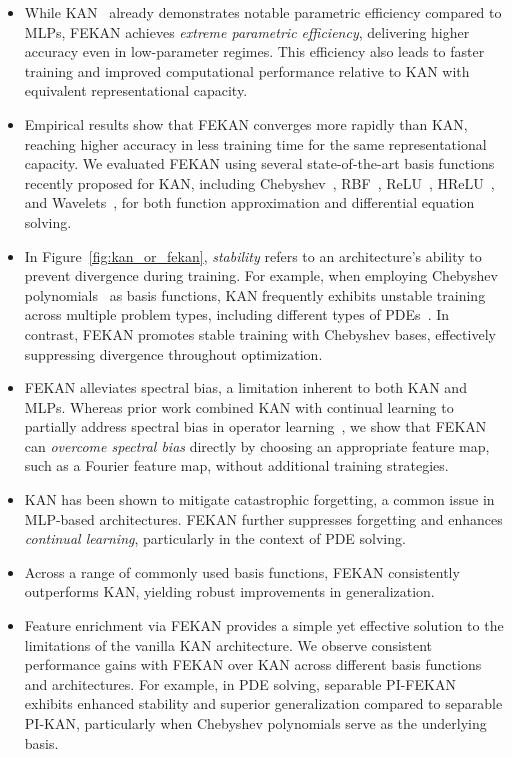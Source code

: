 \documentclass{article}
\begin{document}
\begin{itemize}
    \item While KAN~\cite{liu2024kan} already demonstrates notable parametric efficiency compared to MLPs, FEKAN achieves \textit{extreme parametric efficiency}, delivering higher accuracy even in low-parameter regimes. This efficiency also leads to faster training and improved computational performance relative to KAN with equivalent representational capacity.

    \item Empirical results show that FEKAN converges more rapidly than KAN, reaching higher accuracy in less training time for the same representational capacity. We evaluated FEKAN using several state-of-the-art basis functions recently proposed for KAN, including Chebyshev~\cite{ss2024chebyshev}, RBF~\cite{li2024kolmogorov}, ReLU~\cite{qiu2024relu}, HReLU~\cite{so2025higher}, and Wavelets~\cite{bozorgasl2405wav}, for both function approximation and differential equation solving.

    \item In Figure~\ref{fig:kan_or_fekan}, \textit{stability} refers to an architecture's ability to prevent divergence during training. For example, when employing Chebyshev polynomials~\cite{ss2024chebyshev} as basis functions, KAN frequently exhibits unstable training across multiple problem types, including different types of PDEs~\cite{shukla2024comprehensive}. In contrast, FEKAN promotes stable training with Chebyshev bases, effectively suppressing divergence throughout optimization.

    \item FEKAN alleviates spectral bias, a limitation inherent to both KAN and MLPs. Whereas prior work combined KAN with continual learning to partially address spectral bias in operator learning~\cite{Zhang2025BubbleOKAN}, we show that FEKAN can \textit{overcome spectral bias} directly by choosing an appropriate feature map, such as a Fourier feature map, without additional training strategies.

    \item KAN has been shown to mitigate catastrophic forgetting, a common issue in MLP-based architectures. FEKAN further suppresses forgetting and enhances \textit{continual learning}, particularly in the context of PDE solving.  

    \item Across a range of commonly used basis functions, FEKAN consistently outperforms KAN, yielding robust improvements in generalization.

    \item Feature enrichment via FEKAN provides a simple yet effective solution to the limitations of the vanilla KAN architecture. We observe consistent performance gains with FEKAN over KAN across different basis functions and architectures. For example, in PDE solving, separable PI-FEKAN exhibits enhanced stability and superior generalization compared to separable PI-KAN, particularly when Chebyshev polynomials serve as the underlying basis.
\end{itemize}
\end{document}
